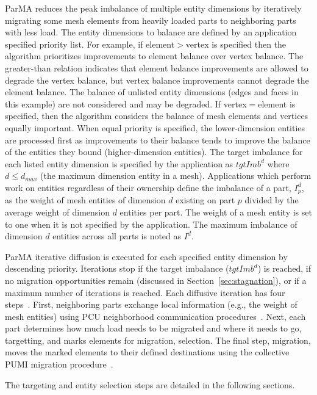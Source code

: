 ParMA reduces the peak imbalance of multiple entity dimensions by
iteratively migrating some mesh elements from heavily loaded parts
to neighboring parts with less load.
The entity dimensions to balance are defined by an application specified priority
list.
For example, if element$>$vertex is specified then the algorithm prioritizes
improvements to element balance over vertex balance.
The greater-than relation indicates that element balance improvements are
allowed to degrade the vertex balance, but vertex balance improvements cannot
degrade the element balance.
The balance of unlisted entity dimensions (edges and faces in this example) are not
considered and may be degraded.
If vertex$=$element is specified, then the algorithm considers the balance of mesh
elements and vertices equally important.
When equal priority is specified, the lower-dimension entities are processed
first as improvements to their balance tends to improve the
balance of the entities they bound (higher-dimension entities).
The target imbalance for each listed entity dimension is specified by the
application as $tgtImb^d$ where $d \leq d_{max}$ (the maximum dimension entity in a
mesh).
Applications which perform work on entities regardless of their ownership define
the imbalance of a part, $I^d_p$, as the weight of mesh entities of dimension $d$
existing on part $p$ divided by the average weight of dimension $d$ entities per
part.
The weight of a mesh entity is set to one when it is not specified by the
application.
The maximum imbalance of dimension $d$ entities across all parts is noted as
$I^d$.

ParMA iterative diffusion is executed for each specified entity dimension by
descending priority.
Iterations stop if the target imbalance ($tgtImb^d$) is reached, if no migration
opportunities remain (discussed in Section~\ref{sec:stagnation}), or if a
maximum number of iterations is reached.
Each diffusive iteration has four steps~\cite{subramanian1994analysis}.
First, neighboring parts exchange local information (e.g., the weight of
mesh entities) using PCU neighborhood communication
procedures~\cite{ibanez2016hybrid}.
Next, each part determines how much load needs to be migrated and
where it needs to go, targetting, and marks elements for migration, selection.
The final step, migration, moves the marked elements to their defined
destinations using the collective PUMI migration procedure~\cite{ibanez2016pumi}.

The targeting and entity selection steps are detailed in the following sections.
